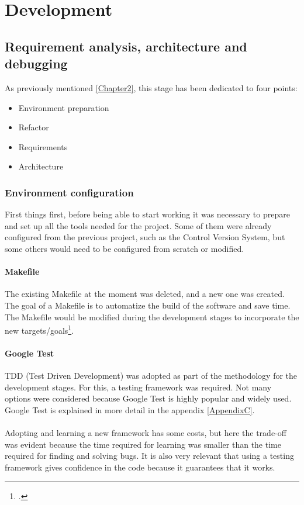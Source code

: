 \chapter{Development} 
\label{Chapter3}

\section{Requirement analysis, architecture and debugging} 
As previously mentioned \ref{Chapter2}, this stage has been dedicated to four points: 
\begin{itemize}
	\item Environment preparation
	\item Refactor
	\item Requirements
	\item Architecture
\end{itemize}

\subsection{Environment configuration}
First things first, before being able to start working it was necessary to prepare and set up all the tools needed for the project. Some of them were already configured from the previous project, such as the Control Version System, but some others would need to be configured from scratch or modified.  


\subsubsection{Makefile}

The existing Makefile at the moment was deleted, and a new one was created. The goal of a Makefile is to automatize the build of the software and save time. The Makefile would be modified during the development stages to incorporate the new targets/goals\footcite{https://en.wikipedia.org/wiki/Makefile}.



\subsubsection{Google Test}

TDD (Test Driven Development) was adopted as part of the methodology for the development stages. For this, a testing framework was required. Not many options were considered because Google Test is highly popular and widely used.  \\
Google Test is explained in more detail in the appendix \ref{AppendixC}.\\\\
Adopting and learning a new framework has some costs, but here the trade-off was evident because the time required for learning was smaller than the time required for finding and solving bugs. It is also very relevant that using a testing framework gives confidence in the code because it guarantees that it works.  


